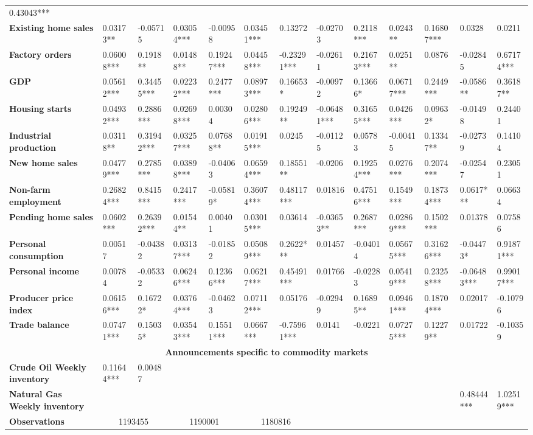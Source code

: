 \begin{sidewaystable}
{\begin{tabular}{@{}lllllllllllll@{}}
0.43043*** \\ \textbf{Existing home sales}& 0.03173** & -0.05715 & 0.03054*** & -0.00958 & 0.03451*** & 0.13272 & -0.02703 & 0.2118*** & 0.0243** & 0.16807*** & 0.0328 & 0.0211 \\ \textbf{Factory orders}& 0.06008*** & 0.1918** & 0.01488** & 0.19247*** & 0.04458*** & -0.23291*** & -0.02611 & 0.21673*** & 0.0251** & 0.0876 & -0.02845 & 0.67174*** \\ \textbf{GDP}& 0.05612*** & 0.34455*** & 0.02232*** & 0.2477*** & 0.08973*** & 0.16653* & -0.00972 & 0.13666* & 0.06717*** & 0.2449*** & -0.0586** & 0.36187** \\ \textbf{Housing starts}& 0.04932*** & 0.2886*** & 0.02698*** & 0.00304 & 0.02806*** & 0.19249** & -0.06481*** & 0.31655*** & 0.0426*** & 0.09632* & -0.01498 & 0.24401 \\ \textbf{Industrial production}& 0.03118** & 0.31942*** & 0.03257*** & 0.07688** & 0.01915*** & 0.0245 & -0.01125 & 0.05783 & -0.00415 & 0.13347** & -0.02739 & 0.14104 \\ \textbf{New home sales}& 0.04779*** & 0.2785*** & 0.03898*** & -0.04063 & 0.06594*** & 0.18551** & -0.0206 & 0.19254*** & 0.0276*** & 0.2074*** & -0.02547 & 0.23051 \\ \textbf{Non-farm employment}& 0.26824*** & 0.8415*** & 0.2417*** & -0.05819* & 0.36074*** & 0.48117*** & 0.01816 & 0.47516*** & 0.1549*** & 0.18734*** & 0.0617*** & 0.06634 \\ \textbf{Pending home sales}& 0.0602*** & 0.26392*** & 0.01544** & 0.00401 & 0.03015*** & 0.03614 & -0.03653** & 0.2687*** & 0.02869*** & 0.1502*** & 0.01378 & 0.07586 \\ \textbf{Personal consumption}& 0.00517 & -0.04382 & 0.03137*** & -0.01852 & 0.05089*** & 0.2622*** & 0.01457 & -0.04014 & 0.05675*** & 0.31626*** & -0.04473* & 0.91871*** \\ \textbf{Personal income}& 0.00784 & -0.05332 & 0.06246*** & 0.12366*** & 0.06217*** & 0.45491*** & 0.01766 & -0.02283 & 0.05419*** & 0.23258*** & -0.06483*** & 0.99017*** \\ \textbf{Producer price index}& 0.06156*** & 0.16722* & 0.03764*** & -0.04623 & 0.07112*** & 0.05176 & -0.02949 & 0.16895** & 0.09461*** & 0.18704*** & 0.02017 & -0.10796 \\ \textbf{Trade balance}& 0.07471*** & 0.15035* & 0.03543*** & 0.15511*** & 0.0667*** & -0.75961*** & 0.0141 & -0.0221 & 0.07275*** & 0.12279** & 0.01722 & -0.10359 \\  \midrule \multicolumn{13}{c}{\textbf{Announcements specific to commodity markets}} \\ \midrule \textbf{Crude Oil Weekly inventory}& 0.11644*** & 0.00487 &  &  &  &  &  &  &  &  &  &  \\ \textbf{Natural Gas Weekly inventory}&  &  &  &  &  &  &  &  &  &  & 0.48444*** & 1.02519*** \\  \midrule \textbf{Observations}             &\multicolumn{2}{c}{ 1193455 }                                                 & \multicolumn{2}{c}{ 1190001 }                                                 & \multicolumn{2}{c}{ 1180816 }    
\end{tabular}}
\end{sidewaystable}
